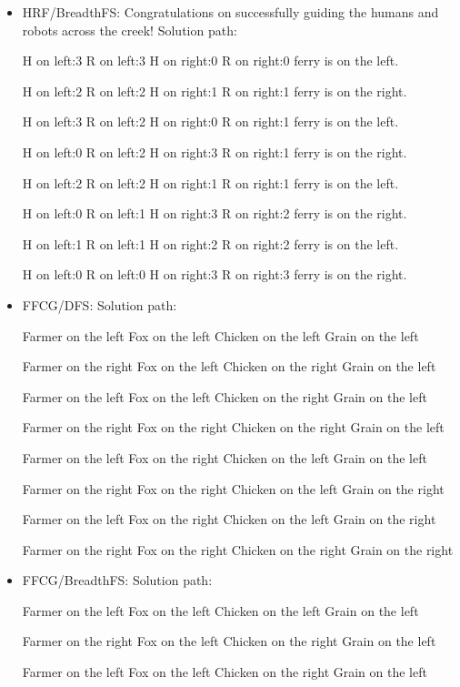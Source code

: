 \documentclass{article}
\begin{document}
 \begin{itemize}
 \item HRF/BreadthFS: Congratulations on successfully guiding the humans and robots across the creek!
Solution path: 

 H on left:3
 R on left:3
   H on right:0
   R on right:0
 ferry is on the left.


 H on left:2
 R on left:2
   H on right:1
   R on right:1
 ferry is on the right.


 H on left:3
 R on left:2
   H on right:0
   R on right:1
 ferry is on the left.


 H on left:0
 R on left:2
   H on right:3
   R on right:1
 ferry is on the right.


 H on left:2
 R on left:2
   H on right:1
   R on right:1
 ferry is on the left.


 H on left:0
 R on left:1
   H on right:3
   R on right:2
 ferry is on the right.


 H on left:1
 R on left:1
   H on right:2
   R on right:2
 ferry is on the left.


 H on left:0
 R on left:0
   H on right:3
   R on right:3
 ferry is on the right.
 \item FFCG/DFS: Solution path: 

 Farmer on the left
 Fox on the left
 Chicken on the left
 Grain on the left

 Farmer on the right
 Fox on the left
 Chicken on the right
 Grain on the left

 Farmer on the left
 Fox on the left
 Chicken on the right
 Grain on the left

 Farmer on the right
 Fox on the right
 Chicken on the right
 Grain on the left

 Farmer on the left
 Fox on the right
 Chicken on the left
 Grain on the left

 Farmer on the right
 Fox on the right
 Chicken on the left
 Grain on the right

 Farmer on the left
 Fox on the right
 Chicken on the left
 Grain on the right

 Farmer on the right
 Fox on the right
 Chicken on the right
 Grain on the right
 \item FFCG/BreadthFS: 
 Solution path: 

 Farmer on the left
 Fox on the left
 Chicken on the left
 Grain on the left

 Farmer on the right
 Fox on the left
 Chicken on the right
 Grain on the left

 Farmer on the left
 Fox on the left
 Chicken on the right
 Grain on the left


\end{itemize}
\end{document}
